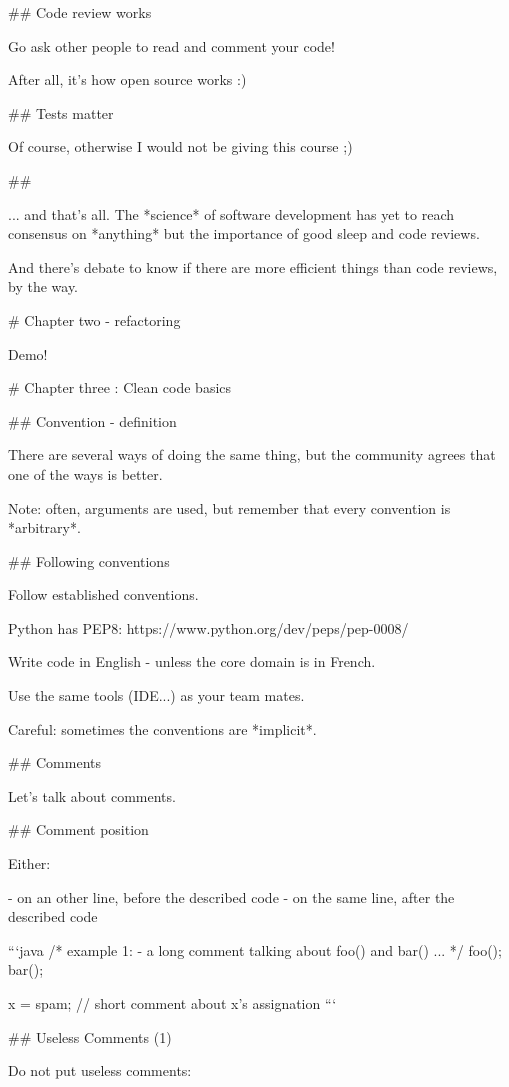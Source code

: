## Code review works

Go ask other people to read and comment your code!

After all, it's how open source works :)

## Tests matter

Of course, otherwise I would not be giving this course ;)

##

... and that's all. The *science* of software development has yet to reach
consensus on *anything* but the importance of good sleep and code reviews.

And there's debate to know if there are more efficient things than code
reviews, by the way.

# Chapter two - refactoring

Demo!

# Chapter three : Clean code basics

## Convention - definition

There are several ways of doing the same thing, but the community agrees that one of the ways is better.

Note: often, arguments are used, but remember that every convention is *arbitrary*.

## Following conventions

Follow established conventions.

Python has PEP8:  https://www.python.org/dev/peps/pep-0008/

\vfill

Write code in English - unless the core domain is in French.

\vfill

Use the same tools (IDE...) as your team mates.

Careful: sometimes the conventions are *implicit*.

## Comments

Let's talk about comments.

## Comment position

Either:

- on an other line, before the described code
- on the same line, after the described code

```java
/*
example 1: - a long comment talking
about foo() and bar() ...
*/
foo();
bar();

x = spam;  // short comment about x's assignation
```

## Useless Comments (1)

Do not put useless comments:

